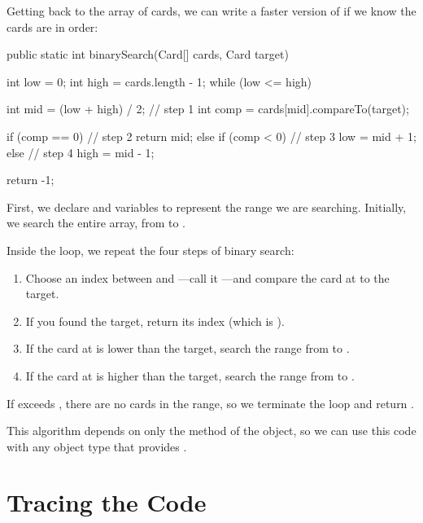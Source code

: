 Getting back to the array of cards, we can write a faster version of  if we know the cards are in order:

\begin{code}
public static int binarySearch(Card[] cards, Card target) {
    int low = 0;
    int high = cards.length - 1;
    while (low <= high) {
        int mid = (low + high) / 2;                 // step 1
        int comp = cards[mid].compareTo(target);

        if (comp == 0) {                            // step 2
            return mid;
        } else if (comp < 0) {                      // step 3
            low = mid + 1;
        } else {                                    // step 4
            high = mid - 1;
        }
    }
    return -1;
}
\end{code}

First, we declare  and  variables to represent the range we are searching.
Initially, we search the entire array, from  to .

Inside the  loop, we repeat the four steps of binary search:

\begin{enumerate}

\item Choose an index between  and ---call it ---and compare the card at  to the target.

\item If you found the target, return its index (which is ).

\item If the card at  is lower than the target, search the range from  to .

\item If the card at  is higher than the target, search the range from  to .

\end{enumerate}

If  exceeds , there are no cards in the range, so we terminate the loop and return .

This algorithm depends on only the  method of the object, so we can use this code with any object type that provides .


\section{Tracing the Code}

